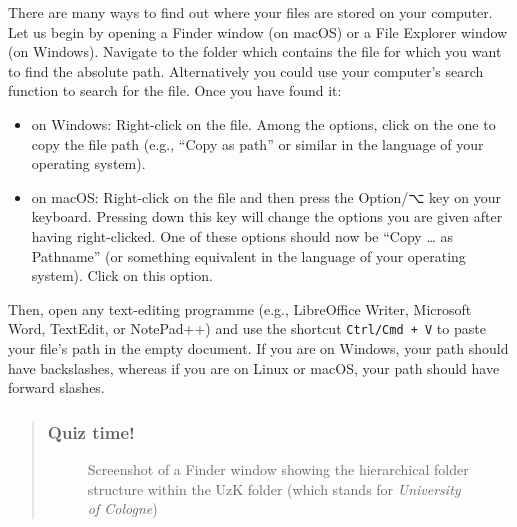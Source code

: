 \documentclass[
  letterpaper,
  DIV=11,
  numbers=noendperiod]{scrreprt}
\begin{document}
There are many ways to find out where your files are stored on your
computer. Let us begin by opening a Finder window (on macOS) or a File
Explorer window (on Windows). Navigate to the folder which contains the
file for which you want to find the absolute path. Alternatively you
could use your computer's search function to search for the file. Once
you have found it:

\begin{itemize}
\item
  on Windows: Right-click on the file. Among the options, click on the
  one to copy the file path (e.g., ``Copy as path'' or similar in the
  language of your operating system).
\item
  on macOS: Right-click on the file and then press the Option/⌥ key on
  your keyboard. Pressing down this key will change the options you are
  given after having right-clicked. One of these options should now be
  ``Copy \ldots{} as Pathname'' (or something equivalent in the language
  of your operating system). Click on this option.
\end{itemize}

Then, open any text-editing programme (e.g., LibreOffice Writer,
Microsoft Word, TextEdit, or NotePad++) and use the shortcut
\texttt{Ctrl/Cmd\ +\ V} to paste your file's path in the empty document.
If you are on Windows, your path should have backslashes, whereas if you
are on Linux or macOS, your path should have forward slashes.

\begin{quote}
\subsubsection*{Quiz time!}\label{quiz-time-2}

\begin{figure}


\caption{\label{fig-FinderWindowPath}Screenshot of a Finder window
showing the hierarchical folder structure within the UzK folder (which
stands for \emph{University of Cologne})}

\end{figure}%
\end{quote}
\end{document}
